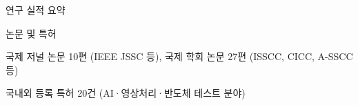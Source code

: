 \documentclass{resume-ko} %
\begin{document}

\begin{section}{연구 실적 요약}

\begin{subsection}{논문 및 특허}{}{}{}
\item 국제 저널 논문 10편 (IEEE JSSC 등), 국제 학회 논문 27편 (ISSCC, CICC, A-SSCC 등)
\item 국내외 등록 특허 20건 (AI·영상처리·반도체 테스트 분야)
\end{subsection}

\end{section}
\end{document}
